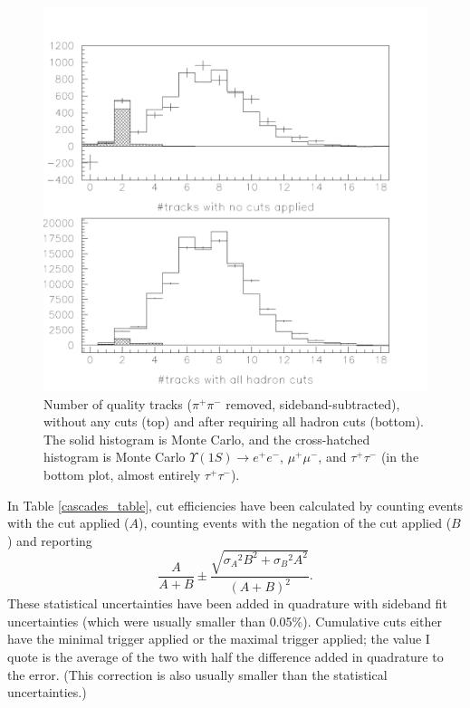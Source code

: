 \begin{figure}[p]
  \includegraphics[width=\linewidth]{plots/cascades_tracks}
  \caption{\label{cascades_tracks} Number of quality tracks
  ($\pi^+\pi^-$ removed, sideband-subtracted), without any cuts (top)
  and after requiring all hadron cuts (bottom).  The solid histogram
  is Monte Carlo, and the cross-hatched histogram is Monte Carlo
  $\Upsilon(1S) \to e^+e^-$, $\mu^+\mu^-$, and $\tau^+\tau^-$ (in
  the bottom plot, almost entirely $\tau^+\tau^-$).}
\end{figure}

In Table \ref{cascades_table}, cut efficiencies have been calculated
by counting events with the cut applied ($A$), counting events with
the negation of the cut applied ($B$) and reporting
\begin{equation}
  \frac{A}{A+B} \pm \frac{\sqrt{{\sigma_A}^2 B^2 + {\sigma_B}^2
  A^2}}{(A+B)^2} \mbox{.}
\end{equation}
These statistical uncertainties have been added in quadrature with
sideband fit uncertainties (which were usually smaller than 0.05\%).
Cumulative cuts either have the minimal trigger applied or the maximal
trigger applied; the value I quote is the average of the two with half
the difference added in quadrature to the error.  (This correction is
also usually smaller than the statistical uncertainties.)

